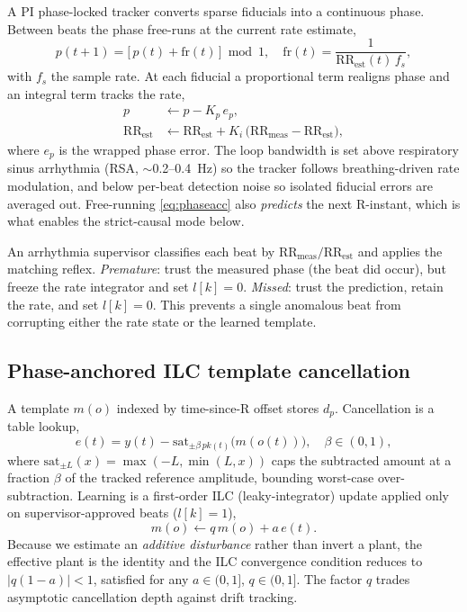\documentclass[conference]{IEEEtran}
\begin{document}
A PI phase-locked tracker converts sparse fiducials into a continuous phase. Between beats the phase
free-runs at the current rate estimate,
\begin{equation}
p(t+1) = \big[\,p(t) + \mathrm{fr}(t)\,\big] \bmod 1, \quad
\mathrm{fr}(t) = \frac{1}{\mathrm{RR}_{\mathrm{est}}(t)\,f_s},
\label{eq:phaseacc}
\end{equation}
with $f_s$ the sample rate. At each fiducial a proportional term realigns phase and an integral term
tracks the rate,
\begin{align}
p &\leftarrow p - K_p\,e_p, \label{eq:pcorr}\\
\mathrm{RR}_{\mathrm{est}} &\leftarrow \mathrm{RR}_{\mathrm{est}}
  + K_i\,\big(\mathrm{RR}_{\mathrm{meas}} - \mathrm{RR}_{\mathrm{est}}\big),
\label{eq:rcorr}
\end{align}
where $e_p$ is the wrapped phase error. The loop bandwidth is set above respiratory sinus arrhythmia
(RSA, $\sim$0.2--0.4~Hz) so the tracker follows breathing-driven rate modulation, and below per-beat
detection noise so isolated fiducial errors are averaged out. Free-running \eqref{eq:phaseacc} also
\emph{predicts} the next R-instant, which is what enables the strict-causal mode below.

An arrhythmia supervisor classifies each beat by
$\mathrm{RR}_{\mathrm{meas}}/\mathrm{RR}_{\mathrm{est}}$ and applies the matching reflex.
\emph{Premature}: trust the measured phase (the beat did occur), but freeze the rate integrator and
set $l[k]=0$. \emph{Missed}: trust the prediction, retain the rate, and set $l[k]=0$. This prevents
a single anomalous beat from corrupting either the rate state or the learned template.

\subsection{Phase-anchored ILC template cancellation}
A template $m(o)$ indexed by time-since-R offset stores $d_p$. Cancellation is a table lookup,
\begin{equation}
e(t) = y(t) - \mathrm{sat}_{\pm\beta\,pk(t)}\big(m(o(t))\big),\quad \beta\in(0,1),
\label{eq:cancel}
\end{equation}
where $\mathrm{sat}_{\pm L}(x)=\max(-L,\min(L,x))$ caps the subtracted amount at a fraction $\beta$
of the tracked reference amplitude, bounding worst-case over-subtraction. Learning is a first-order
ILC (leaky-integrator) update applied only on supervisor-approved beats ($l[k]=1$),
\begin{equation}
m(o) \leftarrow q\,m(o) + a\,e(t).
\label{eq:learn}
\end{equation}
Because we estimate an \emph{additive disturbance} rather than invert a plant, the effective plant is
the identity and the ILC convergence condition reduces to $|q(1-a)|<1$, satisfied for any
$a\in(0,1]$, $q\in(0,1]$. The factor $q$ trades asymptotic cancellation depth against drift tracking.
\end{document}
